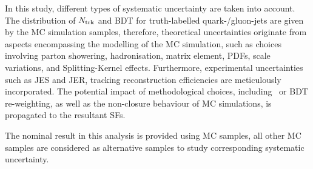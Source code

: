 In this study, different types of systematic uncertainty are taken into account. The distribution of $N_{\mathrm{trk}}$ and BDT for truth-labelled quark-/gluon-jets are given by the MC simulation samples, therefore, theoretical uncertainties originate from aspects encompassing the modelling of the MC simulation, such as choices involving parton showering, hadronisation, matrix element, PDFs, scale variations, and Splitting-Kernel effects. Furthermore, experimental uncertainties such as JES and JER, tracking reconstruction efficiencies are meticulously incorporated. The potential impact of methodological choices, including \ntrk~or BDT re-weighting, as well as the non-closure behaviour of MC simulations, is propagated to the resultant SFs.

The nominal result in this analysis is provided using  MC samples, all other MC samples are considered as alternative samples to study corresponding systematic uncertainty.


